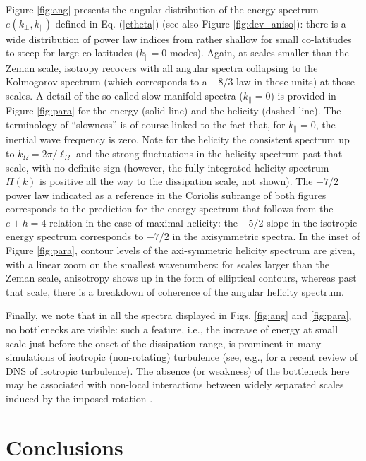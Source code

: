 \documentclass[aps,amsmath,amssymb,floatfix,showpacs]{revtex4}
\begin{document}
Figure \ref{fig:ang} presents the angular distribution of the energy spectrum $e(k_\perp,k_\parallel)$ defined in Eq. (\ref{etheta}) (see also  Figure \ref{fig:dev_aniso}): there is a wide distribution of power law indices from rather shallow for small co-latitudes to steep for large co-latitudes ($k_\parallel = 0$ modes). Again, at scales smaller than the Zeman scale, isotropy recovers with all angular spectra collapsing {to} the Kolmogorov spectrum (which corresponds to a $-8/3$ law in those units) at those scales. A detail of the so-called slow manifold spectra ($k_{\parallel}=0$) is provided in Figure \ref{fig:para} for the energy (solid line) and the helicity (dashed line). The terminology of ``slowness'' is of course linked to the fact that, for $k_{\parallel}=0$, the inertial wave frequency is zero. Note for the helicity the consistent spectrum up to $k_{\Omega}=2\pi/\ell_{\Omega}$ and the strong fluctuations in the helicity spectrum past that scale, with no definite sign (however, the fully integrated helicity spectrum $H(k)$ is positive all the way to the dissipation scale, not shown). The $-7/2$ power law indicated as a reference in the Coriolis subrange of both figures corresponds to the prediction for the energy spectrum that follows from the $e+h=4$ relation in the case of maximal helicity: the $-5/2$ slope in the isotropic energy spectrum corresponds to $-7/2$ in the axisymmetric spectra. In the inset of Figure \ref{fig:para}, contour levels of the axi-symmetric helicity spectrum are given, with a linear zoom on the smallest wavenumbers: for scales larger than the Zeman scale, anisotropy shows up in the form of elliptical contours, whereas past that scale, there is a breakdown of coherence of the angular helicity spectrum. 

Finally, we note that in all the spectra displayed in Figs. \ref{fig:ang} and \ref{fig:para}, no bottlenecks are visible: such a feature, i.e., the increase of energy at small scale just before the onset of the dissipation range, is prominent in many simulations of isotropic (non-rotating) turbulence (see, e.g., \citealt{ishihara} for a recent review of DNS of isotropic turbulence). The absence (or weakness) of the bottleneck here may be associated with non-local interactions between widely separated scales induced by the imposed rotation \citep{alex}.

\section{Conclusions}\label{s:conclu}
\end{document}
